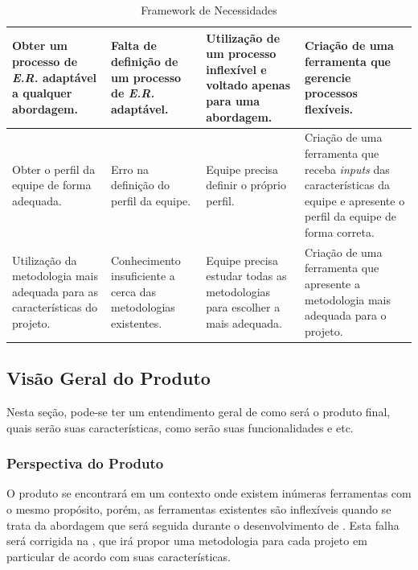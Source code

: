 \begin{table}[H]
\begin{tabular}{|p{5cm}|p{3cm}|p{3cm}|p{5cm}|}
\\ \hline
Obter um processo de \textit{E.R.} adaptável a qualquer abordagem. &
Falta de definição de um processo de \textit{E.R.} adaptável. &
Utilização de um processo inflexível e voltado apenas para uma abordagem. &
Criação de uma ferramenta que gerencie processos flexíveis.
\\ \hline
Obter o perfil da equipe de forma adequada. &
Erro na definição do perfil da equipe. &
Equipe precisa definir o próprio perfil. &
Criação de uma ferramenta que receba \textit{inputs} das características da equipe e apresente o perfil da equipe de forma correta.
\\ \hline
Utilização da metodologia mais adequada para as características do projeto.&
Conhecimento insuficiente a cerca das metodologias existentes. &
Equipe precisa estudar todas as metodologias para escolher a mais adequada. &
Criação de uma ferramenta que apresente a metodologia mais adequada para o projeto.
\\ \hline
\end{tabular}
\caption{Framework de Necessidades}
\label{tab:frameworknecessidade}
\end{table}

\subsection{Visão Geral do Produto}
	
Nesta seção, pode-se ter um entendimento geral de como será o produto final, quais serão suas características, como serão suas funcionalidades e etc.

\subsubsection{Perspectiva do Produto}
	
O produto se encontrará em um contexto onde existem inúmeras ferramentas com o mesmo propósito, porém, as ferramentas existentes são inflexíveis quando se trata da abordagem que será seguida durante o desenvolvimento de \sw. Esta falha será corrigida na \nomeferramenta, que irá propor uma metodologia para cada projeto em particular de acordo com suas características.

